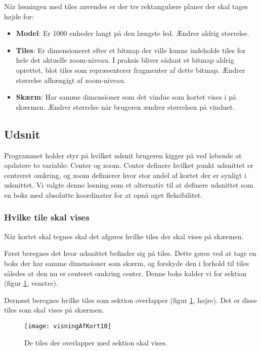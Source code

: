 Når løsningen med tiles anvendes er der tre rektangulære planer der skal tages højde for:

\begin{itemize}
	\item \textbf{Model}: Er 1000 enheder langt på den længste led. Ændrer aldrig størrelse.
	\item \textbf{Tiles}: Er dimensioneret efter et bitmap der ville kunne indeholde tiles for hele det aktuelle zoom-niveau. I praksis bliver sådant et bitmap aldrig oprettet, blot tiles som repræsenterer fragmenter af dette bitmap. Ændrer størrelse afhængigt af zoom-niveau.
	\item \textbf{Skærm}: Har samme dimensioner som det vindue som kortet vises i på skærmen. Ændrer størrelse når brugeren ændrer størrelsen på vinduet.
\end{itemize}

\subsection{Udsnit}
\label{subsec:udsnit}

Programmet holder styr på hvilket udsnit brugeren kigger på ved løbende at opdatere to variable: Center og zoom. Center definere hvilket punkt udsnittet er centreret omkring, og zoom definierer hvor stor andel af kortet der er synligt i udsnittet. Vi valgte denne løsning som et alternativ til at definere udsnittet som en boks med absolutte koordinater for at opnå øget fleksibilitet.

\subsubsection{Hvilke tile skal vises}
\label{subsec:hvilkeTilesSkalVises}

Når kortet skal tegnes skal det afgøres hvilke tiles der skal vises på skærmen.

Først beregnes det hvor udsnittet befinder sig på tiles. Dette gøres ved at tage en boks der har samme dimensioner som skærm, og forskyde den i forhold til tiles således at den nu er centeret omkring center. Denne boks kalder vi for sektion (figur \ref{figur:visningAfKort10}, venstre).

Dernæst beregnes hvilke tiles som sektion overlapper (figur \ref{figur:visningAfKort10}, højre). Det er disse tiles som skal vises på skærmen.

\begin{figure}[h]
	\centering
	\texttt{[image: visningAfKort10]}
	\captionsetup{width=0.8\textwidth}
	\caption{De tiles der overlapper med sektion skal vises.}
	\label{figur:visningAfKort10}
\end{figure}

